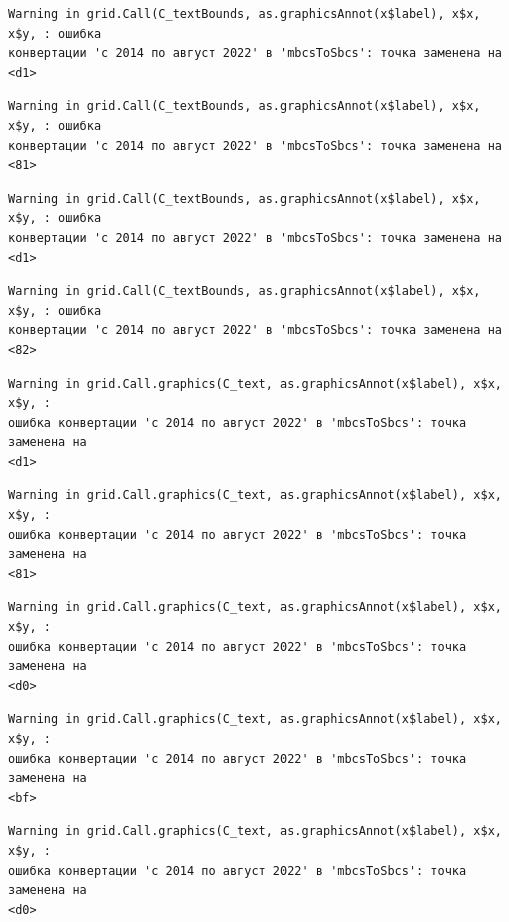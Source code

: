 \documentclass[
  letterpaper,
  DIV=11,
  numbers=noendperiod]{scrreprt}
\begin{document}
\begin{verbatim}
Warning in grid.Call(C_textBounds, as.graphicsAnnot(x$label), x$x, x$y, : ошибка
конвертации 'с 2014 по август 2022' в 'mbcsToSbcs': точка заменена на <d1>
\end{verbatim}

\begin{verbatim}
Warning in grid.Call(C_textBounds, as.graphicsAnnot(x$label), x$x, x$y, : ошибка
конвертации 'с 2014 по август 2022' в 'mbcsToSbcs': точка заменена на <81>
\end{verbatim}

\begin{verbatim}
Warning in grid.Call(C_textBounds, as.graphicsAnnot(x$label), x$x, x$y, : ошибка
конвертации 'с 2014 по август 2022' в 'mbcsToSbcs': точка заменена на <d1>
\end{verbatim}

\begin{verbatim}
Warning in grid.Call(C_textBounds, as.graphicsAnnot(x$label), x$x, x$y, : ошибка
конвертации 'с 2014 по август 2022' в 'mbcsToSbcs': точка заменена на <82>
\end{verbatim}

\begin{verbatim}
Warning in grid.Call.graphics(C_text, as.graphicsAnnot(x$label), x$x, x$y, :
ошибка конвертации 'с 2014 по август 2022' в 'mbcsToSbcs': точка заменена на
<d1>
\end{verbatim}

\begin{verbatim}
Warning in grid.Call.graphics(C_text, as.graphicsAnnot(x$label), x$x, x$y, :
ошибка конвертации 'с 2014 по август 2022' в 'mbcsToSbcs': точка заменена на
<81>
\end{verbatim}

\begin{verbatim}
Warning in grid.Call.graphics(C_text, as.graphicsAnnot(x$label), x$x, x$y, :
ошибка конвертации 'с 2014 по август 2022' в 'mbcsToSbcs': точка заменена на
<d0>
\end{verbatim}

\begin{verbatim}
Warning in grid.Call.graphics(C_text, as.graphicsAnnot(x$label), x$x, x$y, :
ошибка конвертации 'с 2014 по август 2022' в 'mbcsToSbcs': точка заменена на
<bf>
\end{verbatim}

\begin{verbatim}
Warning in grid.Call.graphics(C_text, as.graphicsAnnot(x$label), x$x, x$y, :
ошибка конвертации 'с 2014 по август 2022' в 'mbcsToSbcs': точка заменена на
<d0>
\end{verbatim}
\end{document}
